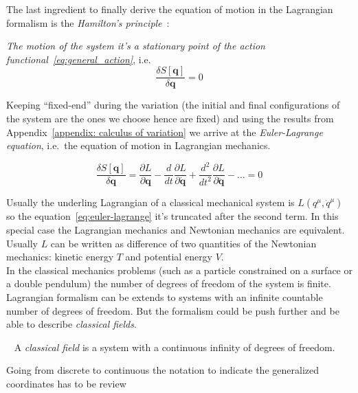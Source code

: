The last ingredient to finally derive the equation of motion in the Lagrangian
formalism is the \emph{Hamilton's principle}~\cite{Goldstein11_Ham_principle}:
\begin{displayquote}
  \emph{The motion of the system it's a stationary point of the action
  functional~\eqref{eq:general_action}}, i.e.
  \begin{equation*}
    \frac{\delta S[\bm{q}]}{\delta \bm{q}} = 0
  \end{equation*}
\end{displayquote}
Keeping ``fixed-end'' during the variation (the initial and final configurations
of the system are the ones we choose hence are fixed) and using the results from
Appendix~\ref{appendix: calculus of variation} we arrive at the
\emph{Euler-Lagrange equation}, i.e.\ the equation of motion in Lagrangian
mechanics.

\begin{equation} \label{eq:euler-lagrange}
  \frac{\delta S[\bm{q}]}{\delta \bm{q}} =
  \frac{\partial L}{\partial \bm{q}} -
  \frac{d}{dt}\frac{\partial L}{\partial \dot{\bm{q}}} +
  \frac{d^2}{dt^2}\frac{\partial L}{\partial \ddot{\bm{q}}} -
  \ldots = 0
\end{equation}

Usually the underling Lagrangian of a classical mechanical system is $L(q^{\mu},
\dot{q}^{\mu})$ so the equation~\eqref{eq:euler-lagrange} it's truncated after
the second term. In this special case the Lagrangian mechanics and Newtonian
mechanics are equivalent. Usually $L$ can be written as difference of two
quantities of the Newtonian mechanics: kinetic energy $T$ and potential energy
$V$. \\

In the classical mechanics problems (such as a particle constrained on a surface
or a double pendulum) the number of degrees of freedom of the system is finite.
Lagrangian formalism can be extends to systems with an infinite countable number
of degrees of freedom. But the formalism could be push further and be able to
describe \emph{classical fields}.

\begin{definition}\label{def: classical field}~\cite{
  Aldrovandi19_classical_field}
  A \emph{classical field} is a system with a continuous infinity of degrees of
  freedom.
\end{definition}

Going from discrete to continuous the notation to indicate the generalized
coordinates has to be review

